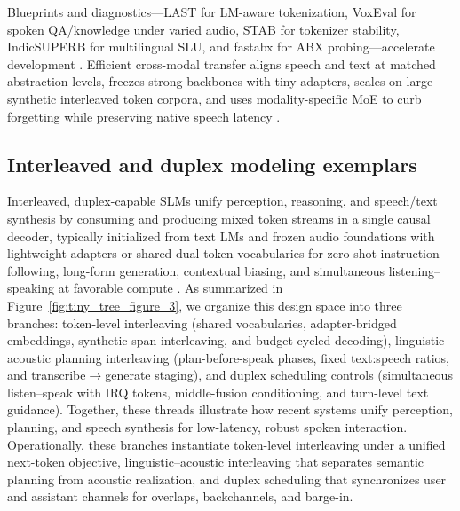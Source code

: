 \documentclass{article}
\begin{document}
Blueprints and diagnostics---LAST for LM-aware tokenization, VoxEval for spoken QA/knowledge under varied audio, STAB for tokenizer stability, IndicSUPERB for multilingual SLU, and fastabx for ABX probing---accelerate development \cite{turetzky2024lastlanguagemodelawarespeechtokenization,cui2025voxevalbenchmarkingknowledgeunderstandin,vashishth2024stabspeechtokenizerassessmentbenchmark,entry2025indicsuperbspeechprocessinguniversalperf,poli2025fastabxlibraryefficientcomputationabxdis}. Efficient cross-modal transfer aligns speech and text at matched abstraction levels, freezes strong backbones with tiny adapters, scales on large synthetic interleaved token corpora, and uses modality-specific MoE to curb forgetting while preserving native speech latency \cite{cuervo2025textspeechlanguagemodelsimprovedcrossmod,shao2025deeptalktowardsseamlesssmartspeechintera,wang2023slmbridgethingapbetweenspeechtextfoundat,zeng2024scalingspeechtextpretrainingsyntheticint,entry2025towardjointlanguagemodelingspeechunitste}.

\subsection{Interleaved and duplex modeling exemplars} \label{subsec:interleavedandduplexmodelingexemplars}
Interleaved, duplex-capable SLMs unify perception, reasoning, and speech/text synthesis by consuming and producing mixed token streams in a single causal decoder, typically initialized from text LMs and frozen audio foundations with lightweight adapters or shared dual-token vocabularies for zero-shot instruction following, long-form generation, contextual biasing, and simultaneous listening--speaking at favorable compute \cite{maimon2025scalinganalysisinterleavedspeechtextlang,park2025longformspeechgenerationspokenlanguagemo,wang2023slmbridgethingapbetweenspeechtextfoundat,wang2025dualspeechlmtowardsunifiedspeechundersta,entry2025towardjointlanguagemodelingspeechunitste}. As summarized in Figure~\ref{fig:tiny_tree_figure_3}, we organize this design space into three branches: token-level interleaving (shared vocabularies, adapter-bridged embeddings, synthetic span interleaving, and budget-cycled decoding), linguistic--acoustic planning interleaving (plan-before-speak phases, fixed text:speech ratios, and transcribe$\rightarrow$generate staging), and duplex scheduling controls (simultaneous listen--speak with IRQ tokens, middle-fusion conditioning, and turn-level text guidance). Together, these threads illustrate how recent systems unify perception, planning, and speech synthesis for low-latency, robust spoken interaction. Operationally, these branches instantiate token-level interleaving under a unified next-token objective, linguistic--acoustic interleaving that separates semantic planning from acoustic realization, and duplex scheduling that synchronizes user and assistant channels for overlaps, backchannels, and barge-in.
\end{document}
